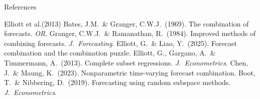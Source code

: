 \documentclass[11pt,aspectratio=169]{beamer}
\begin{document}
\begin{frame}[allowframebreaks]{References}
  \footnotesize
  \begin{thebibliography}{Elliott et al.(2013)}
     Bates, J.M.\ \& Granger, C.W.J.\ (1969).
      The combination of forecasts. \emph{OR}.
     Granger, C.W.J.\ \& Ramanathan, R.\ (1984).
      Improved methods of combining forecasts. \emph{J.\ Forecasting}.
     Elliott, G.\ \& Liao, Y.\ (2025).
      Forecast combination and the combination puzzle.
     Elliott, G., Gargano, A.\
      \& Timmermann, A.\ (2013). Complete subset regressions.
      \emph{J.\ Econometrics}.
     Chen, J.\ \& Maung, K.\ (2023).
      Nonparametric time-varying forecast combination.
     Boot, T.\ \& Nibbering, D.\ (2019).
      Forecasting using random subspace methods. \emph{J.\ Econometrics}.
  \end{thebibliography}
\end{frame}
\end{document}
